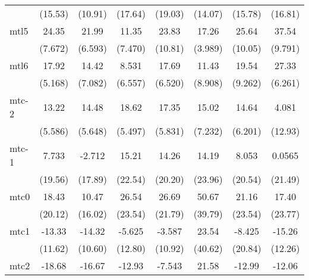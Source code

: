 \documentclass{article}
\begin{document}
{\begin{longtable}{l*{7}{c}}
                &  (15.53)         &  (10.91)         &  (17.64)         &  (19.03)         &  (14.07)         &  (15.78)         &  (16.81)         \\
mtl5            &    24.35\sym{*}  &    21.99\sym{*}  &    11.35         &    23.83         &    17.26\sym{**} &    25.64         &    37.54\sym{*}  \\
                &  (7.672)         &  (6.593)         &  (7.470)         &  (10.81)         &  (3.989)         &  (10.05)         &  (9.791)         \\
mtl6            &    17.92\sym{*}  &    14.42         &    8.531         &    17.69\sym{*}  &    11.43         &    19.54         &    27.33\sym{**} \\
                &  (5.168)         &  (7.082)         &  (6.557)         &  (6.520)         &  (8.908)         &  (9.262)         &  (6.261)         \\
mtc-2           &    13.22         &    14.48         &    18.62\sym{*}  &    17.35\sym{*}  &    15.02         &    14.64         &    4.081         \\
                &  (5.586)         &  (5.648)         &  (5.497)         &  (5.831)         &  (7.232)         &  (6.201)         &  (12.93)         \\
mtc-1           &    7.733         &   -2.712         &    15.21         &    14.26         &    14.19         &    8.053         &   0.0565         \\
                &  (19.56)         &  (17.89)         &  (22.54)         &  (20.20)         &  (23.96)         &  (20.54)         &  (21.49)         \\
mtc0            &    18.43         &    10.47         &    26.54         &    26.69         &    50.67         &    21.16         &    17.40         \\
                &  (20.12)         &  (16.02)         &  (23.54)         &  (21.79)         &  (39.79)         &  (23.54)         &  (23.77)         \\
mtc1            &   -13.33         &   -14.32         &   -5.625         &   -3.587         &    23.54         &   -8.425         &   -15.26         \\
                &  (11.62)         &  (10.60)         &  (12.80)         &  (10.92)         &  (40.62)         &  (20.84)         &  (12.26)         \\
mtc2            &   -18.68         &   -16.67         &   -12.93         &   -7.543         &    21.58         &   -12.99         &   -12.06         \\

\end{longtable}}
\end{document}
